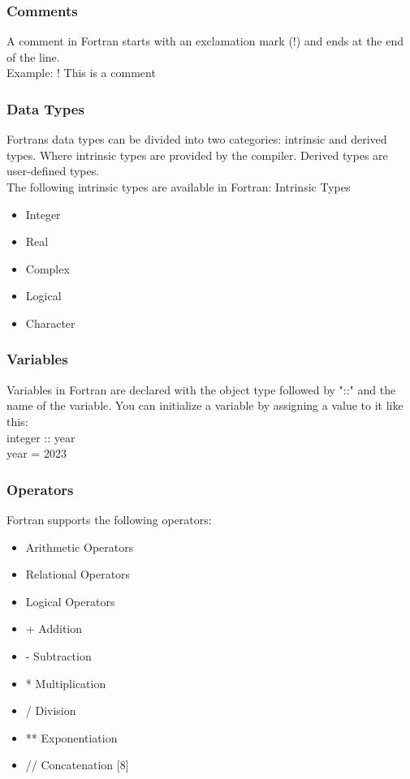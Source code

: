 \documentclass[12pt,a4paper]{scrartcl}
\begin{document}
\subsubsection{Comments}
A comment in Fortran starts with an exclamation mark (!) and ends at the end of the line.\\
Example:
! This is a comment\\

\subsubsection{Data Types}
Fortrans data types can be divided into two categories: intrinsic and derived types. Where intrinsic types are provided by the compiler. Derived types are user-defined types.\\
The following intrinsic types are available in Fortran:
Intrinsic Types
\begin{itemize}
\item Integer
\item Real
\item Complex
\item Logical
\item Character
\end{itemize}

\subsubsection{Variables}
Variables in Fortran are declared with the object type followed by "::" and the name of the variable.
You can initialize a variable by assigning a value to it like this:\\
integer :: year\\
year = 2023\\

\subsubsection{Operators}
Fortran supports the following operators:\\
\begin{itemize}
\item Arithmetic Operators
\item Relational Operators
\item Logical Operators
\end{itemize}

\begin{itemize}
\item + Addition
\item - Subtraction
\item * Multiplication
\item / Division
\item ** Exponentiation
\item // Concatenation [8]
\end{itemize}
\end{document}
